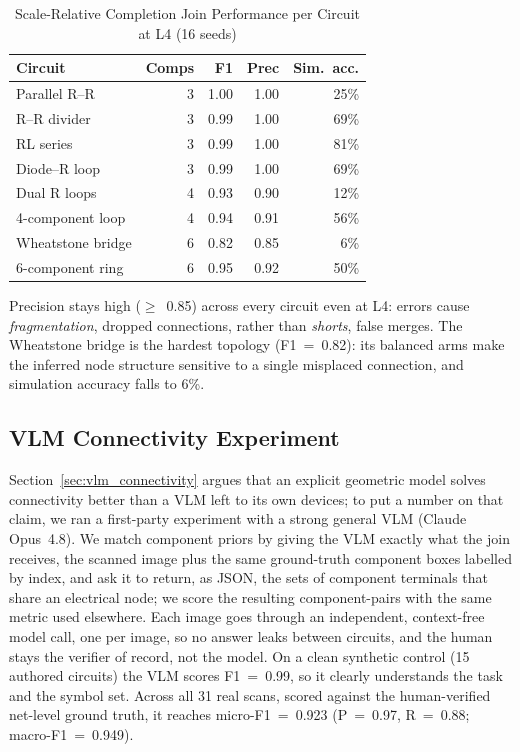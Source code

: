 \documentclass[journal]{IEEEtran}
\begin{document}
\begin{table}[htbp]
\caption{Scale-Relative Completion Join Performance per Circuit at L4 (16 seeds)}
\label{tab:per_circuit}
\begin{center}
\begin{tabular}{lrrrr}
\toprule
\textbf{Circuit} & \textbf{Comps} & \textbf{F1} & \textbf{Prec} & \textbf{Sim.\ acc.} \\
\midrule
Parallel R--R & 3 & 1.00 & 1.00 & 25\% \\
R--R divider & 3 & 0.99 & 1.00 & 69\% \\
RL series & 3 & 0.99 & 1.00 & 81\% \\
Diode--R loop & 3 & 0.99 & 1.00 & 69\% \\
Dual R loops & 4 & 0.93 & 0.90 & 12\% \\
4-component loop & 4 & 0.94 & 0.91 & 56\% \\
Wheatstone bridge & 6 & 0.82 & 0.85 & 6\% \\
6-component ring & 6 & 0.95 & 0.92 & 50\% \\
\bottomrule
\end{tabular}
\end{center}
\end{table}

Precision stays high ($\geq$~0.85) across every circuit even at L4: errors cause \emph{fragmentation}, dropped connections, rather than \emph{shorts}, false merges. The Wheatstone bridge is the hardest topology (F1~=~0.82): its balanced arms make the inferred node structure sensitive to a single misplaced connection, and simulation accuracy falls to 6\%.

\subsection{VLM Connectivity Experiment}
\label{sec:vlm_results}

Section~\ref{sec:vlm_connectivity} argues that an explicit geometric model solves connectivity better than a VLM left to its own devices; to put a number on that claim, we ran a first-party experiment with a strong general VLM (Claude Opus~4.8). We match component priors by giving the VLM exactly what the join receives, the scanned image plus the same ground-truth component boxes labelled by index, and ask it to return, as JSON, the sets of component terminals that share an electrical node; we score the resulting component-pairs with the same metric used elsewhere. Each image goes through an independent, context-free model call, one per image, so no answer leaks between circuits, and the human stays the verifier of record, not the model. On a clean synthetic control (15 authored circuits) the VLM scores F1~=~0.99, so it clearly understands the task and the symbol set. Across all 31 real scans, scored against the human-verified net-level ground truth, it reaches micro-F1~=~0.923 (P~=~0.97, R~=~0.88; macro-F1~=~0.949).
\end{document}

